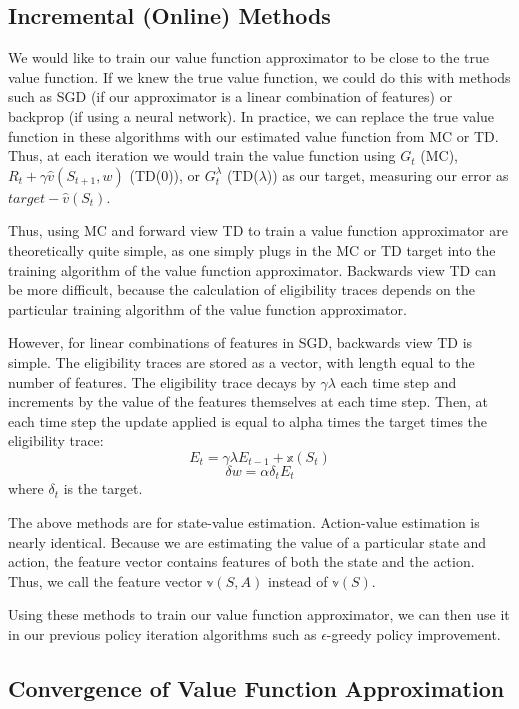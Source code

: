 \documentclass{article}
\newcommand{\eps}{\epsilon}
\begin{document}
\subsection{Incremental (Online) Methods}

We would like to train our value function approximator to be close to the true value function. If we knew the true value function, we could do this with methods such as SGD (if our approximator is a linear combination of features) or backprop (if using a neural network). In practice, we can replace the true value function in these algorithms with our estimated value function from MC or TD. Thus, at each iteration we would train the value function using $G_t$ (MC), $R_t + \gamma\hat{v}(S_{t+1}, w)$ (TD(0)), or $G^\lambda_t$ (TD($\lambda$)) as our target, measuring our error as $target - \hat{v}(S_t)$.

Thus, using MC and forward view TD to train a value function approximator are theoretically quite simple, as one simply plugs in the MC or TD target into the training algorithm of the value function approximator. Backwards view TD can be more difficult, because the calculation of eligibility traces depends on the particular training algorithm of the value function approximator.

However, for linear combinations of features in SGD, backwards view TD is simple. The eligibility traces are stored as a vector, with length equal to the number of features. The eligibility trace decays by $\gamma\lambda$ each time step and increments by the value of the features themselves at each time step. Then, at each time step the update applied is equal to alpha times the target times the eligibility trace:
$$E_t = \gamma\lambda E_{t-1} + \mathbb{x}(S_t)$$
$$\delta w = \alpha\delta_t E_t$$
where $\delta_t$ is the target.

The above methods are for state-value estimation. Action-value estimation is nearly identical. Because we are estimating the value of a particular state and action, the feature vector contains features of both the state and the action. Thus, we call the feature vector $\mathbb{v}(S, A)$ instead of $\mathbb{v}(S)$.

Using these methods to train our value function approximator, we can then use it in our previous policy iteration algorithms such as $\eps$-greedy policy improvement.

\subsection{Convergence of Value Function Approximation}
\end{document}
